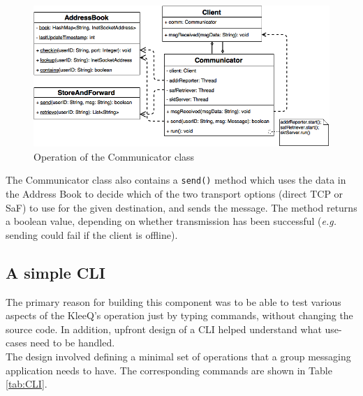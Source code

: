 \documentclass[a4paper, 12pt]{report}
\begin{document}
\begin{figure}[H]
\centering
\includegraphics[width = 0.8 \linewidth]{pics/communicator_uml.png}
\caption{\label{fig:communicator_uml} Operation of the Communicator class}
\end{figure}


The Communicator class also contains a \texttt{send()} method which uses the data in the Address Book to decide which of the two transport options (direct TCP or SaF) to use for the given destination, and sends the message. The method returns a boolean value, depending on whether transmission has been successful (\textit{e.g.} sending could fail if the client is offline).


\subsection{A simple CLI}
\label{subsec:impl.prep.CLI}
The primary reason for building this component was to be able to test various aspects of the KleeQ's operation just by typing commands, without changing the source code. In addition, upfront design of a CLI helped understand what use-cases need to be handled. \\

The design involved defining a minimal set of operations that a group messaging application needs to have. The corresponding commands are shown in Table \ref{tab:CLI}.
\end{document}

